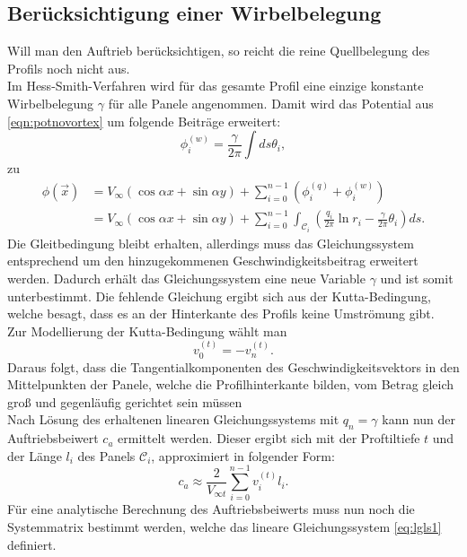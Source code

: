 \subsection{Berücksichtigung einer Wirbelbelegung}
Will man den Auftrieb berücksichtigen, so reicht die reine Quellbelegung des Profils noch nicht aus. \\
Im Hess-Smith-Verfahren wird für das gesamte Profil eine einzige konstante Wirbelbelegung $\gamma$ für alle Panele angenommen. Damit wird das Potential aus \eqref{eqn:potnovortex} um folgende Beiträge erweitert:
\begin{equation}
\phi_i^{(w)} =  \frac{\gamma}{2 \pi } \int ds \theta_i,
\end{equation}
zu
\begin{align}
\phi(\vec x) &=  V_{\infty} (\cos{\alpha} x + \sin{\alpha} y) + \sum_{i=0}^{n-1} \left( \phi_i^{(q)} + \phi_i^{(w)} \right) \nonumber \\
&= V_{\infty} (\cos{\alpha} x + \sin{\alpha} y) + \sum_{i=0}^{n-1} \int_{\mathcal{C}_i} \left( \frac{q_i}{2\pi } \ln r_i - \frac{\gamma}{2\pi } \theta_{i} \right) ds.
\end{align}
Die Gleitbedingung bleibt erhalten, allerdings muss das Gleichungssystem entsprechend um den hinzugekommenen Geschwindigkeitsbeitrag erweitert werden. Dadurch erhält das Gleichungssystem eine neue Variable $\gamma$ und ist somit unterbestimmt. Die fehlende Gleichung ergibt sich aus der Kutta-Bedingung, welche besagt, dass es an der Hinterkante des Profils keine Umströmung gibt.\\
Zur Modellierung der Kutta-Bedingung wählt man
\begin{equation}
v_0^{(t)} =  -v_n^{(t)}.
\end{equation} 
Daraus folgt, dass die Tangentialkomponenten des Geschwindigkeitsvektors in den Mittelpunkten der Panele, welche die Profilhinterkante bilden, vom Betrag gleich groß und gegenläufig gerichtet sein müssen %
\\
Nach Lösung des erhaltenen linearen Gleichungssystems mit $q_n = \gamma$ kann nun der Auftriebsbeiwert $c_a$ ermittelt werden. Dieser ergibt sich mit der Proftiltiefe $t$ und der Länge $l_i$ des Panels $\mathcal{C}_i$, approximiert in folgender Form:
\begin{equation}
c_a \approx \frac{2}{V_{\infty t}}\sum_{i=0}^{n-1} v_i^{(t)} l_i.
\end{equation}
Für eine analytische Berechnung des Auftriebsbeiwerts muss nun noch die Systemmatrix bestimmt werden, welche das lineare Gleichungssystem \eqref{eq:lgls1} definiert. \cite{Hess:1966} \cite{Cebeci:1999} \cite{Alonso:2005}

